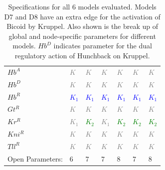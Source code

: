 \begin{table}[h]
\begin{tabular}{lllllll}
$Hb^A$                       &         \textcolor{gray}{$K$}               &             \textcolor{gray}{$K$}           &        \textcolor{gray}{$K$}                &          \textcolor{gray}{$K$}              &        \textcolor{gray}{$K$}                &        \textcolor{gray}{$K$}                \\
$Hb^D$                       &       \textcolor{gray}{$K$}                 &          \textcolor{gray}{$K$}              &      \textcolor{gray}{$K$}                  &           \textcolor{gray}{$K$}             &          \textcolor{gray}{$K$}              &           \textcolor{gray}{$K$}             \\
$Hb^R$                       &         \textcolor{blue}{$K_1$}               &           \textcolor{blue}{$K_1$}             &       \textcolor{blue}{$K_1$}                &              \textcolor{blue}{$K_1$}          &         \textcolor{blue}{$K_1$}              &       \textcolor{blue}{$K_1$}                 \\
$Gt^R$                       &     \textcolor{gray}{$K$}                  &              \textcolor{gray}{$K$}          &      \textcolor{gray}{$K$}                  &            \textcolor{gray}{$K$}            &        \textcolor{gray}{$K$}                &      \textcolor{gray}{$K$}                  \\
$Kr^R$                       &          \textcolor{gray}{$K_1$}              &              \textcolor{green}{$K_2$}          &       \textcolor{gray}{$K_1$}                 &             \textcolor{green}{$K_2$}           &           \textcolor{green}{$K_2$}             &         \textcolor{green}{$K_2$}               \\
$Kni^R$                       &        \textcolor{gray}{$K$}                &         \textcolor{gray}{$K$}               &       \textcolor{gray}{$K$}                 &             \textcolor{gray}{$K$}           &           \textcolor{gray}{$K$}             &         \textcolor{gray}{$K$}               \\
$Tll^R$                       &      \textcolor{gray}{$K$}                  &         \textcolor{gray}{$K$}               &        \textcolor{gray}{$K$}                &                \textcolor{gray}{$K$}        &            \textcolor{gray}{$K$}            &         \textcolor{gray}{$K$}               \\ \hline
Open Parameters:  &  6  &          7             &       7                &           8            &           7            &             8          \\ \hline
\end{tabular}
\vspace{0.25in}
\caption{Specifications for all 6 models evaluated. Models D7 and D8 have an extra edge for the activation of Bicoid by Kruppel. Also shown is the break up of global and node-specific parameters for different models. $Hb^{D}$ indicates parameter for the dual regulatory action of Hunchback on Kruppel.}
\label{tab:table1}
\end{table}


